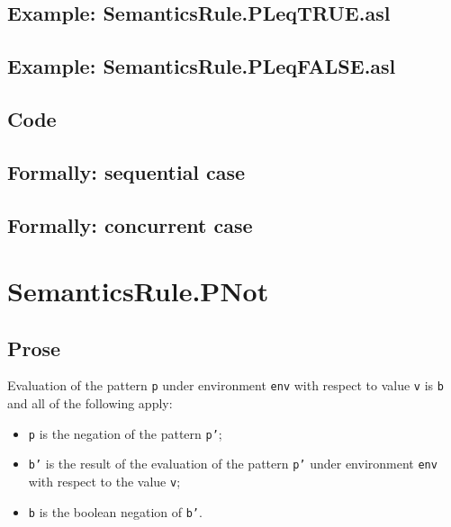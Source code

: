 \documentclass{book}
\begin{document}
    \subsection{Example: SemanticsRule.PLeqTRUE.asl}

    \subsection{Example: SemanticsRule.PLeqFALSE.asl}

  \subsection{Code}

\begin{emptyformal}
  \subsection{Formally: sequential case}

  \subsection{Formally: concurrent case}
\end{emptyformal}


\section{SemanticsRule.PNot \label{sec:SemanticsRule.PNot}}

    \subsection{Prose}
    Evaluation of the pattern \texttt{p} under environment \texttt{env} with
    respect to value \texttt{v} is \texttt{b} and all of the following apply:
    \begin{itemize}
      \item \texttt{p} is the negation of the pattern \texttt{p'};
      \item \texttt{b'} is the result of the evaluation of the pattern
        \texttt{p'} under environment \texttt{env} with respect to the value
        \texttt{v};
      \item \texttt{b} is the boolean negation of \texttt{b'}.
    \end{itemize}
\end{document}
